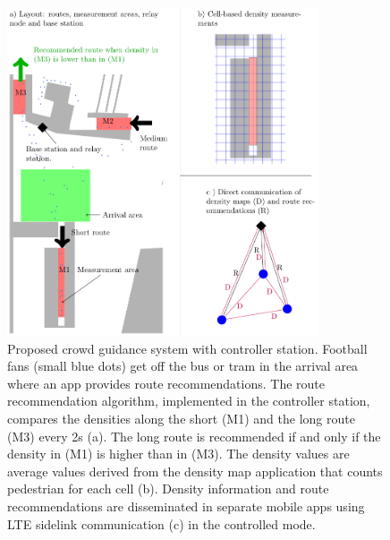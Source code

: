 \begin{figure}[hbt!]
\includegraphics[width=0.82\textwidth]{../figures/investigation/RealisticScenario/conceptFinal.pdf} 
\caption[Proposed crowd guidance system with relay station]{Proposed crowd guidance system with controller station. Football fans (small blue dots) get off the bus or tram in the arrival area where an app provides route recommendations. The route recommendation algorithm, implemented in the controller station, compares the densities along the short (M1) and the long route (M3) every 2s (a). The long route is recommended if and only if the density in (M1) is higher than in (M3). The density values are average values derived from the density map application that counts pedestrian for each cell (b). Density information and route recommendations are disseminated in separate mobile apps using LTE sidelink communication (c) in the controlled mode.}
\label{fig:zentralesSzenario}
\end{figure}


